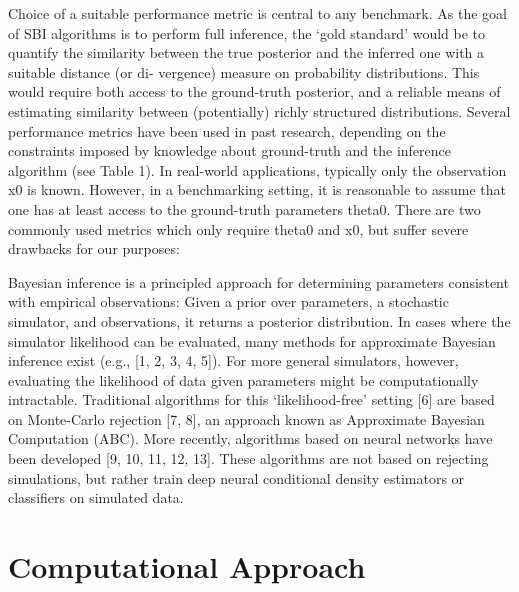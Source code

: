 Choice of a suitable performance metric is central to any benchmark. As the goal of SBI algorithms is to perform full inference, the ‘gold standard’ would be to quantify the similarity between the true posterior and the inferred one with a suitable distance (or di- vergence) measure on probability distributions. This would require both access to the ground-truth posterior, and a reliable means of estimating similarity between (potentially) richly structured distributions. Several performance metrics have been used in past research, depending on the constraints imposed by knowledge about ground-truth and the inference algorithm (see Table 1). In real-world applications, typically only the observation x0 is known. However, in a benchmarking setting, it is reasonable to assume that one has at least access to the ground-truth parameters theta0. There are two commonly used metrics which only require theta0 and
x0, but suffer severe drawbacks for our purposes:


Bayesian inference is a principled approach for determining parameters consistent with empirical observations: Given a prior over parameters, a stochastic simulator, and observations, it returns a posterior distribution. In cases where the simulator likelihood can be evaluated, many methods for approximate Bayesian
inference exist (e.g., [1, 2, 3, 4, 5]). For more general simulators, however, evaluating the likelihood of data
given parameters might be computationally intractable. Traditional algorithms for this ‘likelihood-free’
setting [6] are based on Monte-Carlo rejection [7, 8], an approach known as Approximate Bayesian Computation (ABC). More recently, algorithms based on neural networks have been developed [9, 10, 11, 12, 13].
These algorithms are not based on rejecting simulations, but rather train deep neural conditional density estimators or classifiers on simulated data. 




\chapter{Computational Approach}\label{chap:comp_approach}


